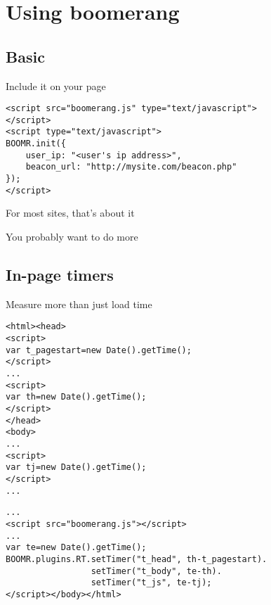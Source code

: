 \documentclass{beamer}
\begin{document}
\section{Using boomerang}

\subsection{Basic}

\begin{frame}[fragile]{Include it on your page}
  \begin{verbatim}
<script src="boomerang.js" type="text/javascript">
</script>
<script type="text/javascript">
BOOMR.init({
    user_ip: "<user's ip address>",
    beacon_url: "http://mysite.com/beacon.php"
});
</script>
  \end{verbatim}
\end{frame}

\begin{frame}{}
  \begin{center}
  For most sites, that's about it
  \end{center}
\end{frame}

\begin{frame}{}
  \begin{center}
  You probably want to do more
  \end{center}
\end{frame}

\subsection{In-page timers}
\begin{frame}[fragile]{Measure more than just load time}
\begin{verbatim}
<html><head>
<script>
var t_pagestart=new Date().getTime();
</script>
...
<script>
var th=new Date().getTime();
</script>
</head>
<body>
...
<script>
var tj=new Date().getTime();
</script>
...
\end{verbatim}
\end{frame}

\begin{frame}[fragile]{}
\begin{verbatim}
...
<script src="boomerang.js"></script>
...
var te=new Date().getTime();
BOOMR.plugins.RT.setTimer("t_head", th-t_pagestart).
                 setTimer("t_body", te-th).
                 setTimer("t_js", te-tj);
</script></body></html>
\end{verbatim}
\end{frame}
\end{document}
